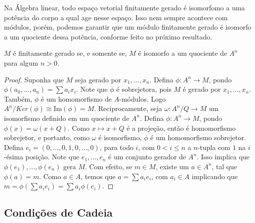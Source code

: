 Na Álgebra linear, todo espaço vetorial finitamente gerado é isomorfomo a uma potência do corpo a qual age nesse espaço. Isso nem sempre acontece com módulos, porém, podemos garantir que um módulo finitamente gerado é isomorfo a um quociente dessa potência, conforme feito no próximo resultado.
\begin{proposition}
	\label{loc:2.3_:_equivalência_de_finitamente_gerado.}
	$M$ é finitamente gerado se, e somente se, $M$ é isomorfo a um quociente de $A^{n}$ para algum $n>0$.
	\begin{proof}

		Suponha que  $M$ seja gerado por $x_{1}, \dots, x_{n}$. Defina $\phi:A^n\to M$, pondo $\phi(a_{0}, \dots, a_{n})= \sum a_{i}x_{i}$. Note que $\phi$ é sobrejetora, pois $M$ é gerado por $x_{1}, \dots, x_{n}$. Também, $\phi$ é um homomorfismo de $A$-módulos. Logo $A^{n}/Ker(\phi) \cong \mathrm{Im}(\phi) = M$.	Reciprocamente, seja $\omega :A^n/Q \to M$ um isomorfismo definido em um quociente de $A^{n}$. Defina $\phi:A^n\to M$, pondo $\phi(x) = \omega(x+Q)$. Como $x \mapsto x+Q$ é a projeção, então é homomorfismo sobrejetor, e portanto, como $\omega$ é isomorfismo, $\phi$ é um homomorfismo sobrejetor.
		Defina $e_{i}= (0, \dots, 0, 1, 0, \dots, 0)$, para todo $i$, com $0 < i \leq n$ a $n$-tupla com $1$ na $i$-ésima posição.	Note que $e_{1}, \dots, e_{n}$ é um conjunto gerador de $A^{n}$.
		Isso implica que $\phi(e_{1}), \dots, \phi(e_{n})$ gera $M$. Com efeito, se $m \in M$, existe um $a \in A^n$, tal que $\phi(a) = m$. Como $a \in A$, temos que $a = \sum a_{i}e_{i}$, com $a_{i} \in A$ implicando que $m = \phi\left( \sum a_{i}e_{i} \right)  =\sum a_{i} \phi(e_{i})$.
	\end{proof}
\end{proposition}




\subsection*{Condições de Cadeia}

